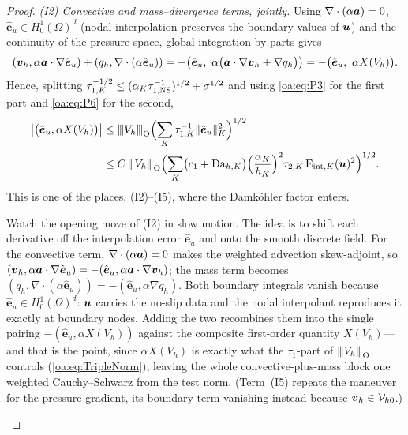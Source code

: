 \begin{proof}
\smallskip\noindent
\emph{(I2) Convective and mass--divergence terms, jointly.} Using
$\nabla\cdot(\alpha\boldsymbol{a}) = 0$, $\hat{\boldsymbol e}_u \in H^1_0(\Omega)^d$
(nodal interpolation preserves the boundary values of $\boldsymbol{u}$) and the continuity of the
pressure space, global integration by parts gives
\[
  (\boldsymbol{v}_h, \alpha\boldsymbol{a}\cdot\nabla\hat{\boldsymbol e}_u)
  + (q_h, \nabla\cdot(\alpha\hat{\boldsymbol e}_u))
  = -\bigl( \hat{\boldsymbol e}_u,\ \alpha\bigl(\boldsymbol{a}\cdot\nabla\boldsymbol{v}_h + \nabla q_h\bigr)
  \bigr)
  = -\bigl( \hat{\boldsymbol e}_u,\ \alpha X(V_h) \bigr).
\]
Hence, splitting $\tau_{1,K}^{-1/2} \le (\alpha_K\tau_{1,\mathrm{NS}}^{-1})^{1/2} + \sigma^{1/2}$ and
using \cref{oa:eq:P3} for the first part and \cref{oa:eq:P6} for the second,
\[
\begin{aligned}
  \bigl|\bigl(\hat{\boldsymbol e}_u, \alpha X(V_h)\bigr)\bigr|
  &\le {\lvert\kern-0.25ex\lvert\kern-0.25ex\lvert V_h \rvert\kern-0.25ex\rvert\kern-0.25ex\rvert}_{\mathrm{O}} \Bigl( \sum_K \tau_{1,K}^{-1} \lVert \hat{\boldsymbol e}_u \rVert_K^2
  \Bigr)^{1/2} \\
  &\le C\,{\lvert\kern-0.25ex\lvert\kern-0.25ex\lvert V_h \rvert\kern-0.25ex\rvert\kern-0.25ex\rvert}_{\mathrm{O}}\Bigl( \sum_K \bigl(c_1 + \mathrm{Da}_{h,K}\bigr)
  \Bigl(\frac{\alpha_K}{h_K}\Bigr)^2 \tau_{2,K}\,\mathrm{E}_{\mathrm{int},K}(\boldsymbol{u})^2 \Bigr)^{1/2}.
\end{aligned}
\]
This is one of the places, (I2)--(I5), where the Damk\"ohler factor enters.

\begin{pedagogy}
Watch the opening move of (I2) in slow motion. The idea is to shift each
derivative off the interpolation error $\hat{\boldsymbol e}_u$ and onto the
smooth discrete field. For the convective term, $\nabla\cdot(\alpha\boldsymbol{a})=0$ makes
the weighted advection skew-adjoint, so
$(\boldsymbol{v}_h,\alpha\boldsymbol{a}\cdot\nabla\hat{\boldsymbol e}_u) =
-(\hat{\boldsymbol e}_u,\alpha\boldsymbol{a}\cdot\nabla\boldsymbol{v}_h)$; the mass term becomes
$(q_h,\nabla\cdot(\alpha\hat{\boldsymbol e}_u)) =
-(\hat{\boldsymbol e}_u,\alpha\nabla q_h)$. Both boundary integrals vanish
because $\hat{\boldsymbol e}_u\in H^1_0(\Omega)^d$: $\boldsymbol{u}$ carries the no-slip
data and the nodal interpolant reproduces it exactly at boundary nodes. Adding
the two recombines them into the single pairing
$-(\hat{\boldsymbol e}_u,\alpha X(V_h))$ against the composite first-order
quantity $X(V_h)$---and that is the point, since $\alpha X(V_h)$ is exactly what the
$\tau_1$-part of ${\lvert\kern-0.25ex\lvert\kern-0.25ex\lvert V_h \rvert\kern-0.25ex\rvert\kern-0.25ex\rvert}_{\mathrm O}$ controls (\cref{oa:eq:TripleNorm}), leaving the whole
convective-plus-mass block one weighted Cauchy--Schwarz from the test norm.
(Term~(I5) repeats the maneuver for the pressure gradient, its boundary term
vanishing instead because $\boldsymbol{v}_h\in \mathcal{V}_{h0}$.)
\end{pedagogy}


\end{proof}
